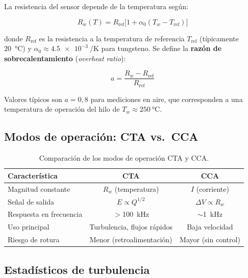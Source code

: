 \documentclass[12pt,a4paper]{article}
\begin{document}
La resistencia del sensor depende de la temperatura según:

\begin{equation}
	R_w(T) = R_\mathrm{ref}\bigl[1 + \alpha_0(T_w - T_\mathrm{ref})\bigr]
	\label{eq:R_T}
\end{equation}

donde $R_\mathrm{ref}$ es la resistencia a la temperatura de referencia
$T_\mathrm{ref}$ (típicamente \SI{20}{\degreeCelsius}) y
$\alpha_0 \approx \SI{4.5e-3}{\per\K}$ para tungsteno.  Se define la
\textbf{razón de sobrecalentamiento} (\emph{overheat ratio}):

\begin{equation}
	a = \frac{R_w - R_\mathrm{ref}}{R_\mathrm{ref}}
	\label{eq:overheat}
\end{equation}

Valores típicos son $a = 0{,}8$ para mediciones en aire, que corresponden a
una temperatura de operación del hilo de $T_w \approx \SI{250}{\degreeCelsius}$.

\subsection{Modos de operación: CTA vs.\ CCA}
\label{subsec:CTA_vs_CCA}

\begin{table}[H]
	\centering
	\caption{Comparación de los modos de operación CTA y CCA.}
	\label{tab:CTA_CCA}
	\begin{tabular}{lcc}
		\toprule
		\textbf{Característica} & \textbf{CTA}                & \textbf{CCA}           \\
		\midrule
		Magnitud constante      & $R_w$ (temperatura)         & $I$ (corriente)        \\
		Señal de salida         & $E \propto Q^{1/2}$         & $\Delta V \propto R_w$ \\
		Respuesta en frecuencia & $>$\SI{100}{\kHz}           & $\sim$\SI{1}{\kHz}     \\
		Uso principal           & Turbulencia, flujos rápidos & Baja velocidad         \\
		Riesgo de rotura        & Menor (retroalimentación)   & Mayor (sin control)    \\
		\bottomrule
	\end{tabular}
\end{table}

\subsection{Estadísticos de turbulencia}
\label{subsec:turbulencia_teoria}
\end{document}
